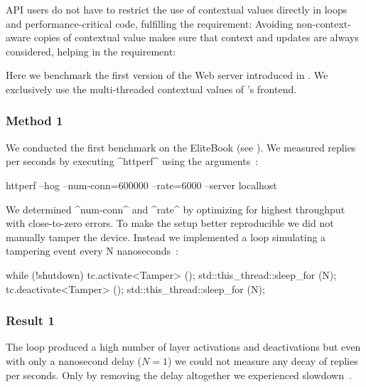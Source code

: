 API users do not have to restrict the use of contextual values directly in loops and performance-critical code, fulfilling the requirement:
\reqFast*
Avoiding non-context-aware copies of contextual value makes sure that context and updates are always considered, helping in the requirement:
\reqConsistency*





\label{sec:evaluation-benchmark-web-server}

Here we benchmark the first version of the Web server introduced in .
We exclusively use the multi-threaded contextual values of \elektra{}'s frontend.

\subsubsection{Method 1}
\label{sec:web-server-method}

We conducted the first benchmark on the EliteBook (see ).
We measured replies per seconds by executing ^httperf^ using the arguments~\cite{raab2015global}:

\begin{code}[language=bash,numbers=none]
httperf --hog --num-conn=600000 --rate=6000 --server localhost
\end{code}

We determined ^num-conn^ and ^rate^ by optimizing for highest throughput with close-to-zero errors.
To make the setup better reproducible we did not manually tamper the device.
Instead we implemented a loop simulating a tampering event every N nanoseconds~\cite{raab2015global}:

\begin{code}[language=Cpp]
while (!shutdown)
{
	tc.activate<Tamper> ();
	std::this_thread::sleep_for (N);
	tc.deactivate<Tamper> ();
	std::this_thread::sleep_for (N);
}
\end{code}

\subsubsection{Result 1}

The loop produced a high number of layer activations and deactivations but even with only a nanosecond delay ($N=1$) we could not measure any decay of replies per seconds.
Only by removing the delay altogether we experienced slowdown~\cite{raab2015global}.

